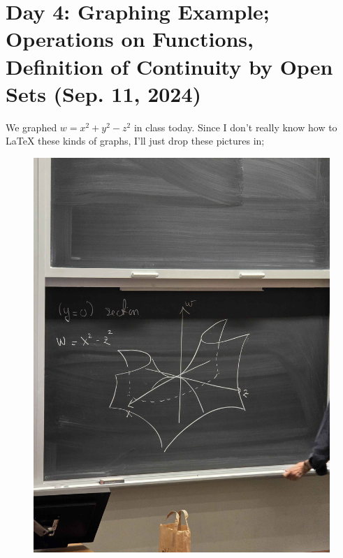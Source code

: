 \section{Day 4: Graphing Example; Operations on Functions, Definition of Continuity by Open Sets (Sep. 11, 2024)}
We graphed $w = x^2 + y^2 - z^2$ in class today. Since I don't really know how to LaTeX these kinds of graphs, I'll just drop these pictures in;
\begin{figure}[h]
    \centering
    \includegraphics[scale=0.06]{MAT257 Notes/Diagrams/Day 4 Graph 1.jpg}

\end{figure}
